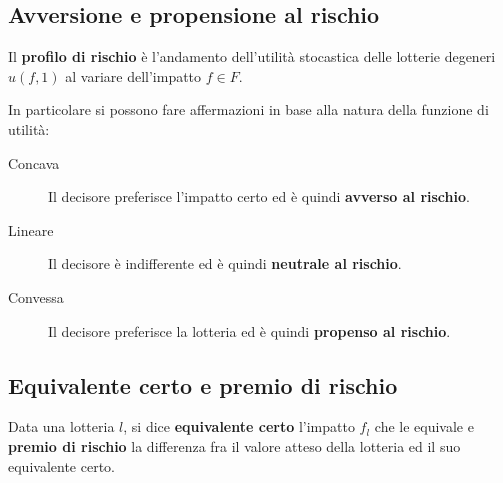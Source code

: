 \documentclass[\main/main.tex]{subfiles}
\begin{document}
\subsection{Avversione e propensione al rischio}
\begin{definition}
  Il \textbf{profilo di rischio} è l'andamento dell'utilità stocastica delle lotterie degeneri $u(f,1)$ al variare dell'impatto $f \in F$.

  In particolare si possono fare affermazioni in base alla natura della funzione di utilità:
  \begin{description}
    \item[Concava] Il decisore preferisce l'impatto certo ed è quindi \textbf{avverso al rischio}.
    \item[Lineare] Il decisore è indifferente ed è quindi \textbf{neutrale al rischio}.
    \item[Convessa] Il decisore preferisce la lotteria ed è quindi \textbf{propenso al rischio}.
  \end{description}
\end{definition}

\subsection{Equivalente certo e premio di rischio}
\begin{definition}
  Data una lotteria $l$, si dice \textbf{equivalente certo} l'impatto $f_l$ che le equivale e \textbf{premio di rischio} la differenza fra il valore atteso della lotteria ed il suo equivalente certo.
\end{definition}
\end{document}
